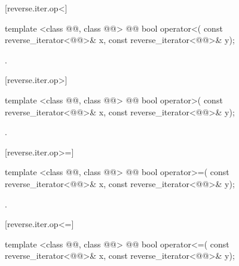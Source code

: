 [reverse.iter.op<]{}

%
\begin{itemdecl}
template <class @@, class @@>
    @@
  bool operator<(
    const reverse_iterator<@@>& x,
    const reverse_iterator<@@>& y);
\end{itemdecl}

\begin{itemdescr}
\pnum
\removed{\returns}
.
\end{itemdescr}

[reverse.iter.op>]{}

%
\begin{itemdecl}
template <class @@, class @@>
    @@
  bool operator>(
    const reverse_iterator<@@>& x,
    const reverse_iterator<@@>& y);
\end{itemdecl}

\begin{itemdescr}
\pnum
\removed{\returns}
.
\end{itemdescr}

[reverse.iter.op>=]{}

%
\begin{itemdecl}
template <class @@, class @@>
    @@
  bool operator>=(
    const reverse_iterator<@@>& x,
    const reverse_iterator<@@>& y);
\end{itemdecl}

\begin{itemdescr}
\pnum
\removed{\returns}
.
\end{itemdescr}

[reverse.iter.op<=]{}

%
\begin{itemdecl}
template <class @@, class @@>
    @@
  bool operator<=(
    const reverse_iterator<@@>& x,
    const reverse_iterator<@@>& y);
\end{itemdecl}

